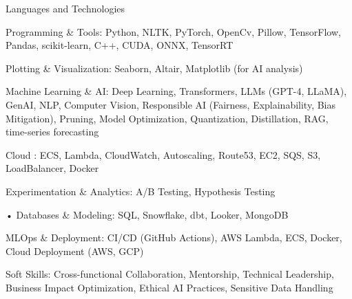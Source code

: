 

\begin{cventries}

  \cventry
    {Languages and Technologies}
    {}
    {}
    {}
    {
     \begin{cvitems} %
      \item {Programming \& Tools: Python, NLTK, PyTorch, OpenCv, Pillow, TensorFlow, Pandas, 
        scikit-learn, C++, CUDA, ONNX, TensorRT}	
      \item {Plotting \& Visualization: Seaborn, Altair, Matplotlib (for AI analysis)}
      \item {Machine Learning \& AI: Deep Learning, Transformers, LLMs (GPT-4, LLaMA), GenAI, NLP, 
        Computer Vision, Responsible AI (Fairness, Explainability, Bias Mitigation), Pruning, Model Optimization, Quantization, 
        Distillation, RAG, time-series forecasting}	
      \item {Cloud : ECS, Lambda, CloudWatch, Autoscaling, Route53, EC2, SQS, S3, LoadBalancer, Docker}
      \item {Experimentation \& Analytics:  A/B Testing, Hypothesis Testing}
	    \item {• Databases \& Modeling: SQL, Snowflake, dbt, Looker, MongoDB}
      \item {MLOps \& Deployment: CI/CD (GitHub Actions), AWS Lambda, ECS, Docker, Cloud Deployment (AWS, GCP)}
      \item {Soft Skills: Cross-functional Collaboration, Mentorship, Technical Leadership, 
      Business Impact Optimization, Ethical AI Practices, Sensitive Data Handling}
     \end{cvitems}
    }

\end{cventries}

